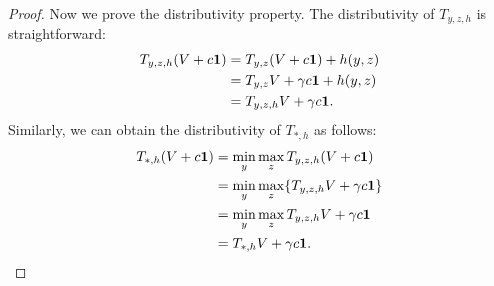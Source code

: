 \documentclass{article}
\theoremstyle{plain}
\theoremstyle{definition}
\theoremstyle{remark}
\begin{document}
\begin{proof}
    Now we prove the distributivity property.
    The distributivity of $T_{y,z,h}$ is straightforward:
    \begin{align}
        T_{y,z,h} (V + c \mathbf{1}) & = T_{y,z} (V + c \mathbf{1}) + h(y,z) \notag\\
        & = T_{y,z} V + \gamma c \mathbf{1} + h(y,z)\notag \\
        & = T_{y,z,h} V + \gamma c \mathbf{1}.
    \end{align}
    Similarly, we can obtain the distributivity of $T_{*,h}$ as follows:
    \begin{align}
        T_{*,h} (V + c \mathbf{1}) & = \min_{y} \max_{z} T_{y,z,h} (V + c \mathbf{1})\notag \\
        & = \min_{y} \max_{z} \{ T_{y,z,h} V + \gamma c \mathbf{1} \}\notag \\
        & = \min_{y} \max_{z} T_{y,z,h} V + \gamma c \mathbf{1}\notag \\
        & = T_{*,h} V + \gamma c \mathbf{1}.
    \end{align}
\end{proof}
\end{document}
